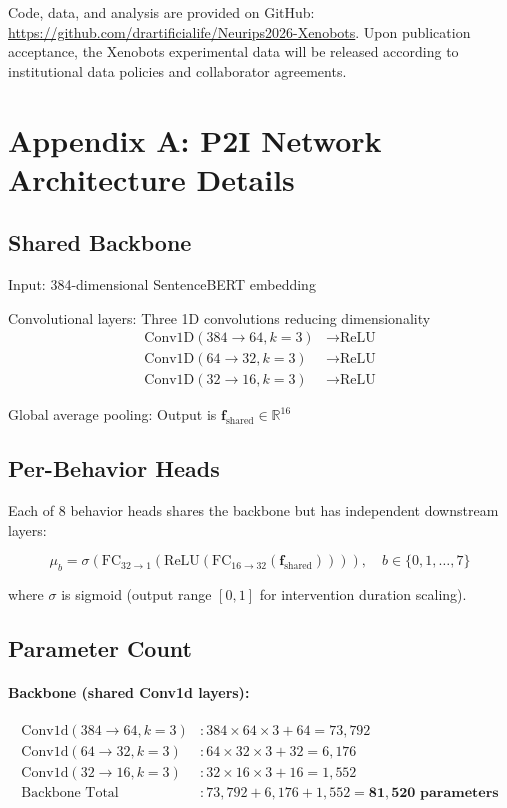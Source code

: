 \documentclass{article}
\begin{document}
Code, data, and analysis are provided on GitHub: \url{https://github.com/drartificialife/Neurips2026-Xenobots}. Upon publication acceptance, the Xenobots experimental data will be released according to institutional data policies and collaborator agreements.

\section*{Appendix A: P2I Network Architecture Details}
\label{app:architecture}

\subsection{Shared Backbone}
Input: 384-dimensional SentenceBERT embedding

Convolutional layers: Three 1D convolutions reducing dimensionality
\begin{align}
\text{Conv1D}(384 \to 64, k=3) &\to \text{ReLU} \\
\text{Conv1D}(64 \to 32, k=3) &\to \text{ReLU} \\
\text{Conv1D}(32 \to 16, k=3) &\to \text{ReLU}
\end{align}

Global average pooling: Output is $\mathbf{f}_{\text{shared}} \in \mathbb{R}^{16}$

\subsection{Per-Behavior Heads}
Each of 8 behavior heads shares the backbone but has independent downstream layers:

\begin{equation}
\mu_b = \sigma\left(\text{FC}_{32 \to 1}\left(\text{ReLU}\left(\text{FC}_{16 \to 32}(\mathbf{f}_{\text{shared}})\right)\right)\right), \quad b \in \{0, 1, \ldots, 7\}
\end{equation}

where $\sigma$ is sigmoid (output range $[0, 1]$ for intervention duration scaling).

\subsection{Parameter Count}

\paragraph{Backbone (shared Conv1d layers):}
\begin{align*}
\text{Conv1d}(384 \to 64, k=3) &: 384 \times 64 \times 3 + 64 = 73,792 \\
\text{Conv1d}(64 \to 32, k=3) &: 64 \times 32 \times 3 + 32 = 6,176 \\
\text{Conv1d}(32 \to 16, k=3) &: 32 \times 16 \times 3 + 16 = 1,552 \\
\text{Backbone Total} &: 73,792 + 6,176 + 1,552 = \mathbf{81,520 \text{ parameters}}
\end{align*}
\end{document}
